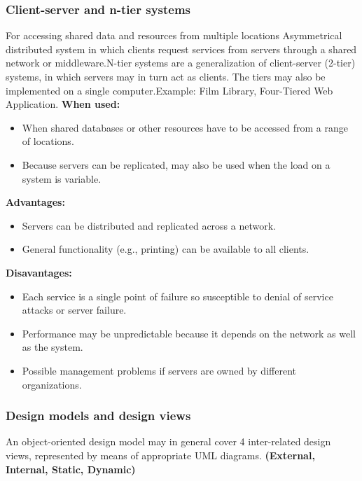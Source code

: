 \documentclass[../ESOF_notes.tex]{subfiles}
\begin{document}
\subsubsection{Client-server and n-tier systems}
For accessing shared data and resources from multiple locations \newline \newline
Asymmetrical distributed system in which clients request services from servers through a shared network or middleware.\newline N-tier systems are a generalization of client-server (2-tier) systems, in which servers may in turn act as clients. The tiers may also be implemented on a single computer.\newline Example: Film Library, Four-Tiered Web Application.\newline\newline
\textbf{When used:}
\begin{itemize}
    \item When shared databases or other resources have to be accessed from a range of locations.
    \item Because servers can be replicated, may also be used when the load on a system is variable.
\end{itemize}
\textbf{Advantages:}
\begin{itemize}
    \item Servers can be distributed and replicated across a network.
    \item General functionality (e.g., printing) can be available to all clients.
\end{itemize}
\textbf{Disavantages:}
\begin{itemize}
    \item Each service is a single point of failure so susceptible to denial of service attacks or server failure.
    \item Performance may be unpredictable because it depends on the network as well as the system.
    \item Possible management problems if servers are owned by different organizations.
\end{itemize}

\subsubsection{Design models and design views}
An object-oriented design model may in general cover 4 inter-related design views, represented by means of appropriate UML diagrams. \textbf{(External, Internal, Static, Dynamic)}
\end{document}
